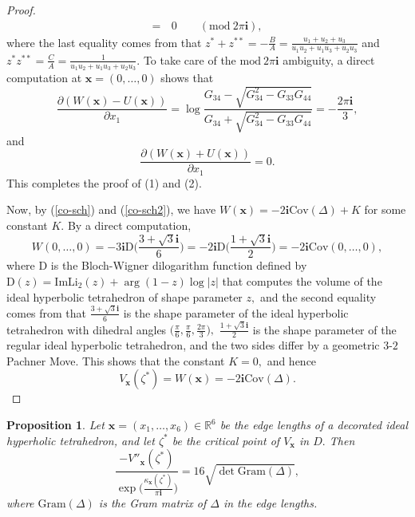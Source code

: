 \documentclass[11pt]{article}
\newtheorem{proposition}[theorem]{Proposition}
\theoremstyle{remark}
\theoremstyle{remark}
\numberwithin{equation}{section}
\begin{document}
\begin{proof}
\begin{equation*}
\begin{split}
=&\, 0 \quad\quad (\mathrm{mod}\ 2\pi\mathbf i),
\end{split}
\end{equation*}
where the last equality comes from that 
$z^*+z^{**}=-\frac{B}{A}=\frac{u_1+u_2+u_3}{u_1u_2+u_1u_3+u_2u_3}$ and $z^*z^{**}=\frac{C}{A}=\frac{1}{u_1u_2+u_1u_3+u_2u_3}.$ To take care of the  $\mathrm{mod}\ 2\pi\mathbf i$ ambiguity, a direct computation at $\boldsymbol x=(0,\dots,0)$ shows that 
$$\frac{\partial (W(\boldsymbol x)-U(\boldsymbol x))}{\partial x_1} =\log\frac{G_{34}-\sqrt{G_{34}^2-G_{33}G_{44}}}{G_{34}+\sqrt{G_{34}^2-G_{33}G_{44}}}=-\frac{2\pi \mathbf i}{3},$$
and 
$$\frac{\partial (W(\boldsymbol x)+U(\boldsymbol x))}{\partial x_1} = 0.$$
This completes the proof of (1) and (2).



Now, by (\ref{co-sch}) and (\ref{co-sch2}), we have $W(\boldsymbol x)=-2\mathbf i \mathrm{Cov}(\Delta)+K$ for some constant $K.$ By a direct computation, 
$$W(0,\dots,0)= -3\mathbf i\mathrm {D}\bigg(\frac{3+\sqrt{3}\mathbf i}{6}\bigg)=-2\mathbf i\mathrm D\bigg(\frac{1+\sqrt{3}\mathbf i}{2}\bigg)=-2\mathbf i\mathrm{Cov}(0,\dots,0),$$
where $\mathrm D$ is the Bloch-Wigner dilogarithm function defined by $\mathrm D(z)=\mathrm{Im}\mathrm{Li}_2(z)+\arg(1-z)\log|z|$ that computes the volume of the ideal hyperbolic tetrahedron of shape parameter $z,$ and the second equality comes from that $\frac{3+\sqrt{3}\mathbf i}{6}$ is the shape parameter of the ideal hyperbolic tetrahedron with dihedral angles $\big(\frac{\pi}{6},\frac{\pi}{6},\frac{2\pi}{3}\big),$ $\frac{1+\sqrt{3}\mathbf i}{2}$ is the shape parameter of the regular ideal hyperbolic tetrahedron, and the two sides differ by a geometric $3$-$2$ Pachner Move. This shows that the constant $K=0,$ and hence 
$$V_{\boldsymbol x}(\zeta^*)=W(\boldsymbol x)=-2\mathbf i \mathrm{Cov}(\Delta).$$   
\end{proof}




\begin{proposition}\label{Hess} Let $\boldsymbol x=(x_1,\dots,x_6)\in\mathbb R^6$  be the edge lengths of a decorated ideal hyperholic tetrahedron, and let $\zeta^*$ be the critical point of $V_{\boldsymbol x}$ in $D.$ 
  Then 
\begin{equation*}
\frac{-V''_{\boldsymbol x}(\zeta^*)}{\exp\big(\frac{\kappa_{\boldsymbol x}(\zeta^*)}{\pi \mathbf i}\big)}=16\sqrt{\det\mathrm{Gram}(\Delta)},
\end{equation*}
where $\mathrm{Gram}(\Delta)$ is the Gram matrix of $\Delta$ in the edge lengths.
\end{proposition}
\end{document}
